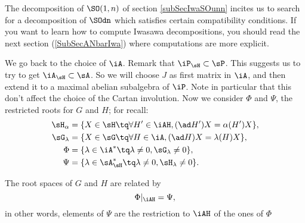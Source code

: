The decomposition of $\SO(1,n)$ of section \ref{subSecIwaSOunn} incites us to search for a decomposition of $\SOdn$ which satisfies certain compatibility conditions. If you want to learn how to compute Iwasawa decompositions, you should read the next section (\ref{SubSecANbarIwa}) where computations are more explicit.

We go back to the choice of $\iA$. Remark that $\iP_{\sH}\subset\sP$. This suggests us to try to get $\iA_{\sH}\subset\sA$. So we will choose $J$ as first matrix in $\iA$, and then extend it to a maximal abelian subalgebra of $\iP$. Note in particular that this don't affect the choice of the Cartan involution. Now we consider $\Phi$ and $\Psi$, the restricted roots for $G$ and $H$; for recall:
\begin{equation}
\begin{split}
  \sH_{\alpha}  &=\{ X\in\sH\tq \forall H'\in\iAH,(\ad H')X=\alpha(H')X \},\\
  \sG_{\lambda} &=\{ X\in\sG\tq \forall H\in\iA,(\ad H)X=\lambda(H)X \},\\
  \Phi        &=\{ \lambda\in\iA^*\tq \lambda\neq 0, \sG_{\lambda}\neq 0 \},\\
  \Psi        &=\{ \lambda\in\sA_{\sH}^*\tq \lambda\neq 0, \sH_{\lambda}\neq 0\}.
\end{split}
\end{equation}

\begin{lemma}
The root spaces of $G$ and $H$ are related by
\[
    \Phi|_{\iAH}=\Psi,
\]
in other words, elements of $\Psi$ are the restriction to $\iAH$ of the ones of $\Phi$
\end{lemma}

